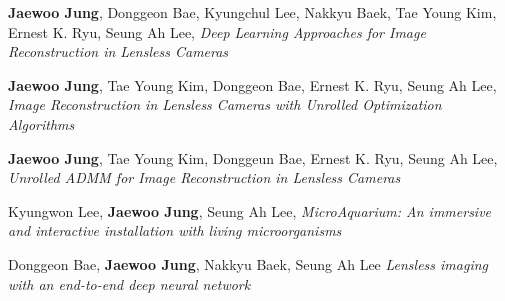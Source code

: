 \documentclass[a4paper,12pt]{memoir} %
\begin{document}



{\textbf{Jaewoo Jung}, Donggeon Bae, Kyungchul Lee, Nakkyu Baek, Tae Young Kim, Ernest K. Ryu, Seung Ah Lee, \textit{Deep Learning Approaches for Image Reconstruction in Lensless Cameras}}




{\textbf{Jaewoo Jung}, Tae Young Kim, Donggeon Bae, Ernest K. Ryu, Seung Ah Lee, \textit{Image Reconstruction in Lensless Cameras with Unrolled Optimization Algorithms}}



{\textbf{Jaewoo Jung}, Tae Young Kim, Donggeun Bae, Ernest K. Ryu, Seung Ah Lee, \textit{Unrolled ADMM for Image Reconstruction in Lensless Cameras}}


\clearpage %

\userinformation %

\framebreak %


{Kyungwon Lee, \textbf{Jaewoo Jung}, Seung Ah Lee, \textit{MicroAquarium: An immersive and interactive installation with living microorganisms}}



{Donggeon Bae, \textbf{Jaewoo Jung}, Nakkyu Baek, Seung Ah Lee \textit{Lensless imaging with an end-to-end deep neural network}}


\end{document}
